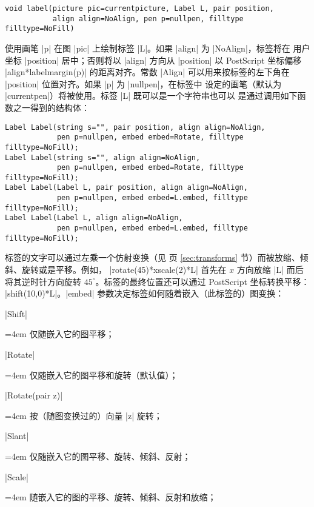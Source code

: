 \documentclass{ctexbook}
\newenvironment{funclist}{\trivlist
  \parindent=0pt
\item[]
  \def\item{\medskip\par\leftskip=0pt}
  \def\go{\par\leftskip=4em}}
{\endtrivlist}
\newcommand*\prgname[1]{\textsf{#1}}
\begin{document}
\begin{lstlisting}
void label(picture pic=currentpicture, Label L, pair position,
           align align=NoAlign, pen p=nullpen, filltype filltype=NoFill)
\end{lstlisting}
使用画笔 |p| 在图 |pic| 上绘制标签 |L|。如果 |align| 为 |NoAlign|，标签将在
用户坐标 |position| 居中；否则将以 |align| 方向从 |position| 以
\prgname{PostScript} 坐标偏移 |align*labelmargin(p)| 的距离对齐。常数 |Align|
可以用来按标签的左下角在 |position| 位置对齐。如果 |p| 为 |nullpen|，在标签中
设定的画笔（默认为 |currentpen|）将被使用。标签 |L| 既可以是一个字符串也可以
是通过调用如下函数之一得到的结构体：
\begin{lstlisting}
Label Label(string s="", pair position, align align=NoAlign,
            pen p=nullpen, embed embed=Rotate, filltype filltype=NoFill);
Label Label(string s="", align align=NoAlign,
            pen p=nullpen, embed embed=Rotate, filltype filltype=NoFill);
Label Label(Label L, pair position, align align=NoAlign,
            pen p=nullpen, embed embed=L.embed, filltype filltype=NoFill);
Label Label(Label L, align align=NoAlign,
            pen p=nullpen, embed embed=L.embed, filltype filltype=NoFill);
\end{lstlisting}
标签的文字可以通过左乘一个仿射变换（见 \pageref{sec:transforms} 页
\ref{sec:transforms} 节）而被放缩、倾斜、旋转或是平移。例如，%
|rotate(45)*xscale(2)*L| 首先在 $x$ 方向放缩 |L| 而后将其逆时针方向旋转
$45^\circ$。标签的最终位置还可以通过 \prgname{PostScript} 坐标转换平移：%
|shift(10,0)*L|。|embed| 参数决定标签如何随着嵌入（此标签的）图变换：
\begin{funclist}
\item |Shift| \go
  仅随嵌入它的图平移；
\item |Rotate| \go
  仅随嵌入它的图平移和旋转（默认值）；
\item |Rotate(pair z)| \go
  按（随图变换过的）向量 |z| 旋转；
\item |Slant| \go
  仅随嵌入它的图平移、旋转、倾斜、反射；
\item |Scale| \go
  随嵌入它的图的平移、旋转、倾斜、反射和放缩；
\end{funclist}
\end{document}
